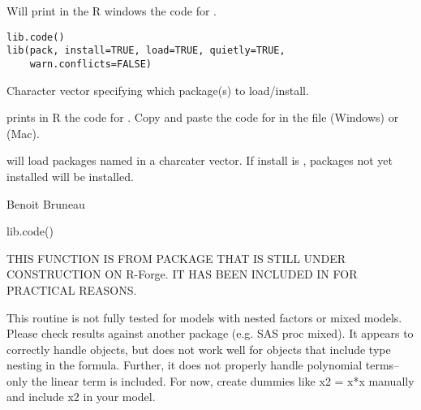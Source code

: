 \documentclass[a4paper]{book}
\begin{document}
\newpage
{}
%
\begin{Description}\relax
Will print in the R windows the code for  . 
\end{Description}
%
\begin{Usage}
\begin{verbatim}
lib.code()
lib(pack, install=TRUE, load=TRUE, quietly=TRUE, 
    warn.conflicts=FALSE)
\end{verbatim}
\end{Usage}
%
\begin{Arguments}
\begin{ldescription}
\item[\code{pack}] Character vector specifying which package(s) to load/install.

\end{ldescription}
\end{Arguments}
%
\begin{Details}\relax



 prints in R the code for . Copy and paste the code for   
in the file  (Windows) or  (Mac).


 will load packages named in a charcater vector. If install is , 
packages not yet installed will be installed.

\end{Details}
%
\begin{Author}\relax
Benoit Bruneau
\end{Author}
%
\begin{Examples}
\begin{ExampleCode}

lib.code()

\end{ExampleCode}
\end{Examples}
\newpage
{}
%
\begin{Description}\relax
THIS FUNCTION IS FROM PACKAGE  THAT IS STILL UNDER CONSTRUCTION ON
R-Forge. IT HAS BEEN INCLUDED IN  FOR PRACTICAL REASONS.

 This routine is not fully tested for models with nested
factors or mixed models. Please check results against another
package (e.g. SAS proc mixed). It appears to correctly handle 
objects, but does
not work well for  objects that include 
type nesting in the formula. Further, it does not properly handle
polynomial terms--only the linear term is included. For now, create
dummies like x2 = x*x manually and include x2 in your model. 
\end{Description}
\end{document}

